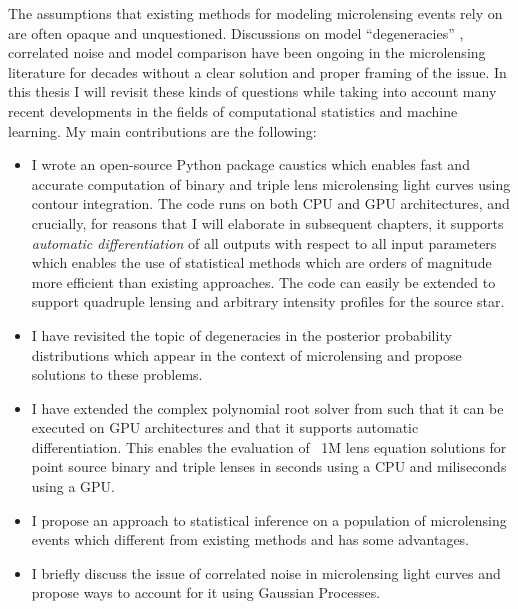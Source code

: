 \documentclass[12pt]{report}
\begin{document}
The assumptions that existing methods for modeling microlensing events rely on
are often opaque and unquestioned. Discussions on model ``degeneracies''
\citep{2014MNRAS.437.4006S,2019AJ....157...23H,2018AcA....68...43S,2009MNRAS.393..816D},
correlated noise \citep{2015ApJ...812..136B,2019MNRAS.488.3308L} and model
comparison \citep{2018AJ....155..259H,2019MNRAS.484.5608D} have been ongoing in
the microlensing literature for decades without a clear solution and proper
framing of the issue. In this thesis I will revisit these kinds of questions
while taking into account many recent developments in the fields of
computational statistics and machine learning. My main contributions are the
following:
\begin{itemize}
    \item I wrote an open-source Python package \textsf{caustics} which enables fast and
          accurate computation of binary and triple lens microlensing light curves using
          contour integration. The code runs on both CPU and GPU architectures, and
          crucially, for reasons that I will elaborate in subsequent chapters, it
          supports \emph{automatic differentiation} of all outputs with respect to all
          input parameters which enables the use of statistical methods which are orders
          of magnitude more efficient than existing approaches. The code can easily be
          extended to support quadruple lensing and arbitrary intensity profiles for the
          source star.
    \item I have revisited the topic of degeneracies in the posterior probability
          distributions which appear in the context of microlensing and propose solutions
          to these problems.
    \item I have extended the complex polynomial root solver from \citet{Cameron2021}
          such that it can be executed on GPU architectures and that it supports
          automatic differentiation. This enables the evaluation of ~1M lens equation
          solutions for point source binary and triple lenses in seconds using a CPU and
          miliseconds using a GPU.
    \item I propose an approach to statistical inference on a population of microlensing
          events which different from existing methods and has some advantages.
    \item I briefly discuss the issue of correlated noise in microlensing light curves
          and propose ways to account for it using Gaussian Processes.
\end{itemize}
\end{document}
